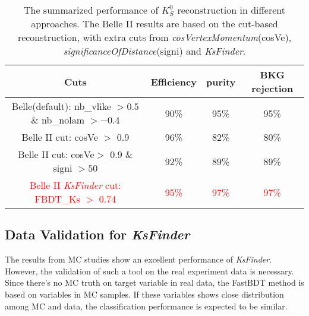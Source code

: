 \begin{table}
	\small
	\begin{tabular}{c|c|c|c} 
		\hline
		Cuts &  Efficiency & purity & BKG rejection\\
		\hline
		Belle(default): nb\_vlike $>0.5$ \& nb\_nolam $> -0.4$ & 90\% & 95\% & 95\% \\
		Belle II cut: cosVe $>$ 0.9 & 96\% & 82\% & 80\% \\
		Belle II cut: cosVe$>$ 0.9 \& signi $>50$ & 92\% & 89\% & 89\% \\
		\textcolor{red}{Belle II \textit{KsFinder} cut: FBDT\_Ks $>$ 0.74} & \textcolor{red}{95\%} & \textcolor{red}{97\%}  & \textcolor{red}{97\%} \\
		\hline
	\end{tabular}
	\caption{The summarized performance of $K_S^0$ reconstruction in different approaches. The Belle II results are based on the cut-based reconstruction, with extra cuts from \textit{cosVertexMomentum}(cosVe), \textit{significanceOfDistance}(signi) and \textit{KsFinder}. }
	\label{tab:ksperf}
\end{table}

\subsection{Data Validation for \textit{KsFinder}}
The results from MC studies show an excellent performance of \textit{KsFinder}. However, the validation of such a tool on the real experiment data is necessary. Since there's no MC truth on target variable in real data, the FastBDT method is based on variables in MC samples. If these variables shows close distribution among MC and data, the classification performance is expected to be similar.

